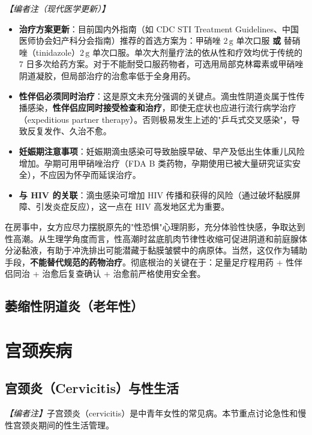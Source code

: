 \noindent\textit{【编者注（现代医学更新）】}
\begin{itemize}
	\item \textbf{治疗方案更新}：目前国内外指南（如 CDC STI Treatment Guidelines、中国医师协会妇产科分会指南）推荐的首选方案为：甲硝唑 $2\,\mathrm{g}$ 单次口服 \textbf{或} 替硝唑（tinidazole）$2\,\mathrm{g}$ 单次口服。单次大剂量疗法的依从性和疗效均优于传统的 $7$ 日多次给药方案。对于不能耐受口服药物者，可选用局部克林霉素或甲硝唑阴道凝胶，但局部治疗的治愈率低于全身用药。
	\item \textbf{性伴侣必须同时治疗}：这是原文未充分强调的关键点。滴虫性阴道炎属于性传播感染，\textbf{性伴侣应同时接受检查和治疗}，即使无症状也应进行流行病学治疗（expeditious partner therapy）。否则极易发生上述的"乒乓式交叉感染"，导致反复发作、久治不愈。
	\item \textbf{妊娠期注意事项}：妊娠期滴虫感染可导致胎膜早破、早产及低出生体重儿风险增加。孕期可用甲硝唑治疗（FDA B 类药物，孕期使用已被大量研究证实安全），不应因为怀孕而延误治疗。
	\item \textbf{与 HIV 的关联}：滴虫感染可增加 HIV 传播和获得的风险（通过破坏黏膜屏障、引发炎症反应），这一点在 HIV 高发地区尤为重要。
\end{itemize}

\begin{tcolorbox}[colback=pink!5!white,colframe=red!50!black,title=贴心小叮咛]
在房事中，女方应尽力摆脱原先的"性恐惧"心理阴影，充分体验性快感，争取达到性高潮。从生理学角度而言，性高潮时盆底肌肉节律性收缩可促进阴道和前庭腺体分泌黏液，有助于冲洗排出可能潜藏于黏膜皱襞中的病原体。当然，这仅作为辅助手段，\textbf{不能替代规范的药物治疗}。彻底根治的关键在于：足量足疗程用药 + 性伴侣同治 + 治愈后复查确认 + 治愈前严格使用安全套。
\end{tcolorbox}

\subsection{萎缩性阴道炎（老年性）}

\section{宫颈疾病}
\subsection{宫颈炎（Cervicitis）与性生活}

\noindent\textit{【编者注】}子宫颈炎（cervicitis）是中青年女性的常见病。本节重点讨论急性和慢性宫颈炎期间的性生活管理。

